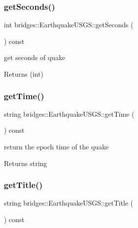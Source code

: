 \subsubsection{\texorpdfstring{get\+Seconds()}{getSeconds()}}
{\footnotesize\ttfamily int bridges\+::\+Earthquake\+U\+S\+G\+S\+::get\+Seconds (\begin{DoxyParamCaption}{ }\end{DoxyParamCaption}) const\hspace{0.3cm}{\ttfamily [inline]}}

get seconds of quake

\begin{DoxyReturn}{Returns}
(int) 
\end{DoxyReturn}
\mbox{\label{classbridges_1_1_earthquake_u_s_g_s_aecadf17367e4227d1d076ee8e38b94ac}} 
\subsubsection{\texorpdfstring{get\+Time()}{getTime()}}
{\footnotesize\ttfamily string bridges\+::\+Earthquake\+U\+S\+G\+S\+::get\+Time (\begin{DoxyParamCaption}{ }\end{DoxyParamCaption}) const\hspace{0.3cm}{\ttfamily [inline]}}

return the epoch time of the quake

\begin{DoxyReturn}{Returns}
string 
\end{DoxyReturn}
\mbox{\label{classbridges_1_1_earthquake_u_s_g_s_af6f2023df25731f96cd1a3d4ef1856d1}} 
\subsubsection{\texorpdfstring{get\+Title()}{getTitle()}}
{\footnotesize\ttfamily string bridges\+::\+Earthquake\+U\+S\+G\+S\+::get\+Title (\begin{DoxyParamCaption}{ }\end{DoxyParamCaption}) const\hspace{0.3cm}{\ttfamily [inline]}}

